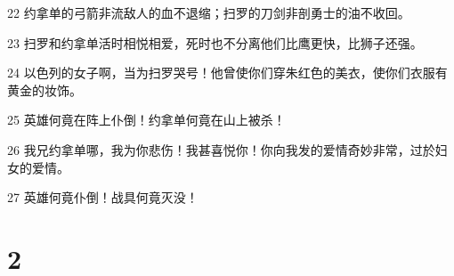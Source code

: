 \par 22 约拿单的弓箭非流敌人的血不退缩；扫罗的刀剑非剖勇士的油不收回。
\par 23 扫罗和约拿单活时相悦相爱，死时也不分离他们比鹰更快，比狮子还强。
\par 24 以色列的女子啊，当为扫罗哭号！他曾使你们穿朱红色的美衣，使你们衣服有黄金的妆饰。
\par 25 英雄何竟在阵上仆倒！约拿单何竟在山上被杀！
\par 26 我兄约拿单哪，我为你悲伤！我甚喜悦你！你向我发的爱情奇妙非常，过於妇女的爱情。
\par 27 英雄何竟仆倒！战具何竟灭没！

\chapter{2}

